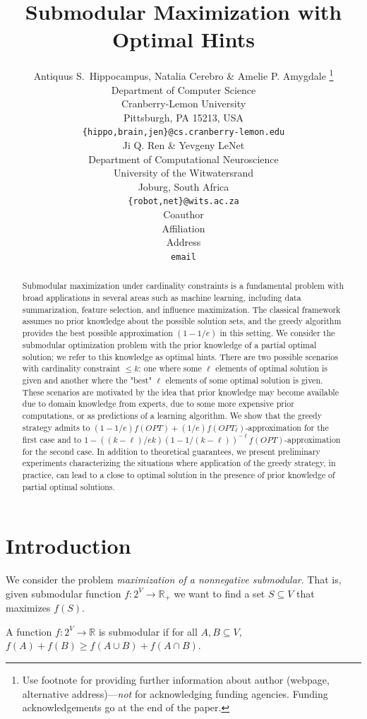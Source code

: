 \documentclass{article} %
\title{Submodular Maximization with Optimal Hints}
\author{Antiquus S.~Hippocampus, Natalia Cerebro \& Amelie P. Amygdale \thanks{ Use footnote for providing further information
about author (webpage, alternative address)---\emph{not} for acknowledging
funding agencies.  Funding acknowledgements go at the end of the paper.} \\
Department of Computer Science\\
Cranberry-Lemon University\\
Pittsburgh, PA 15213, USA \\
\texttt{\{hippo,brain,jen\}@cs.cranberry-lemon.edu} \\
\And
Ji Q. Ren \& Yevgeny LeNet \\
Department of Computational Neuroscience \\
University of the Witwatersrand \\
Joburg, South Africa \\
\texttt{\{robot,net\}@wits.ac.za} \\
\AND
Coauthor \\
Affiliation \\
Address \\
\texttt{email}
}
\begin{document}
\maketitle

\begin{abstract}
Submodular maximization under cardinality constraints is a fundamental problem with broad applications in several areas such as machine learning, including data summarization, feature selection, and influence maximization. The classical framework assumes no prior knowledge about the possible solution sets, and the greedy algorithm provides the best possible approximation $(1-1/e)$ 
in this setting. We consider the submodular optimization problem with the prior knowledge of a partial optimal solution; we refer to this knowledge as optimal hints.  
There are two possible scenarios with cardinality constraint $\leq k$: 
one where some $\ell$ elements of optimal solution is given and another where  the "best" $\ell$ elements of some optimal solution is given. These scenarios are motivated by the idea that prior knowledge may become available due to domain knowledge from experts,  due to some more expensive prior computations, or as predictions of a learning algorithm. We show that the greedy strategy admits to 
$(1-1/e)f(OPT) + (1/e) f(OPT_{\ell})$-approximation for the first case and to $1 - ((k-\ell)/ek) (1 - 1/(k-\ell))^{-\ell}f(OPT)$-approximation for the second case. In addition to theoretical guarantees, we present preliminary experiments characterizing the situations where application of the greedy strategy, in practice, can lead to a close to optimal solution  in the presence of prior knowledge of partial optimal solutions. 

\end{abstract}

\section{Introduction}

We consider the problem \emph{maximization of a nonnegative submodular}. That is, given submodular function $f: 2^{V} \rightarrow \mathbb{R}_+$ we want to find a set $S \subseteq V$ that maximizes $f(S)$. 

A function $f: 2^{V} \rightarrow \mathbb{R}$ is submodular if for all $A, B \subseteq V$, $f(A) + f(B) \geq  f(A \cup B) + f(A \cap B)$. 
\end{document}
